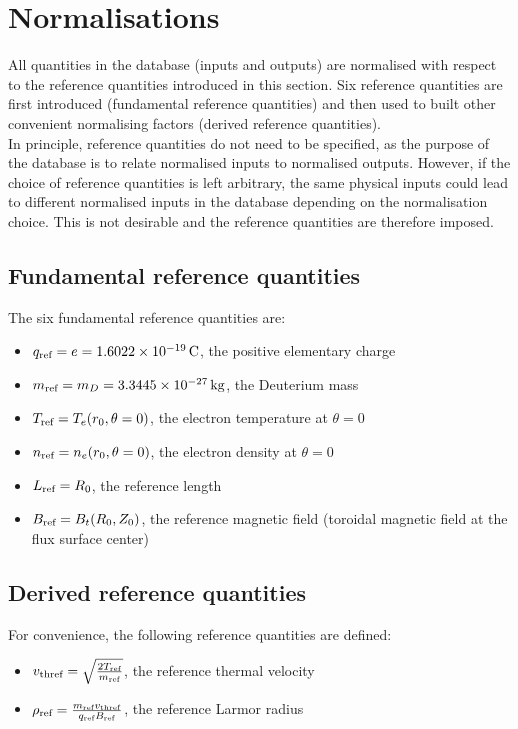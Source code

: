 \documentclass[a4paper]{report}
\begin{document}
\section{Normalisations}
All quantities in the database (inputs and outputs) are normalised with respect to the reference quantities introduced in this section. Six reference quantities are first introduced (fundamental reference quantities) and then used to built other convenient normalising factors (derived reference quantities).\\
In principle, reference quantities do not need to be specified, as the purpose of the database is to relate normalised inputs to normalised outputs. 
However, if the choice of reference quantities is left arbitrary, the same physical inputs could lead to different normalised inputs in the database depending on the normalisation choice. This is not desirable and the reference quantities are therefore imposed. 

\subsection{Fundamental reference quantities}
The six fundamental reference quantities are:
\begin{itemize}
\item $q_{\textrm{ref}}=e=1.6022\times10^{-19}\,\textrm{C}$, the positive elementary charge
\item $m_{\textrm{ref}}=m_D=3.3445\times10^{-27}\,\textrm{kg}$, the Deuterium mass
\item $T_{\textrm{ref}}=T_e(r_0,\theta=0)$, the electron temperature at $\theta=0$
\item $n_{\textrm{ref}}=n_e(r_0,\theta=0)$, the electron density at $\theta=0$
\item $L_{\textrm{ref}}=R_0$, the reference length
\item $B_{\textrm{ref}}=B_t(R_0,Z_0)$, the reference magnetic field (toroidal magnetic field at the flux surface center)
\end{itemize}

\subsection{Derived reference quantities}
For convenience, the following reference quantities are defined:
\begin{itemize}
\item $v_\textrm{thref}=\sqrt{\frac{2T_{\textrm{ref}}}{m_{\textrm{ref}}}}$, the reference thermal velocity
\item $\rho_{\textrm{ref}} = \frac{m_{\textrm{ref}} v_\textrm{thref}}{q_{\textrm{ref}} B_{\textrm{ref}}}$, the reference Larmor radius
\end{itemize}
\end{document}
